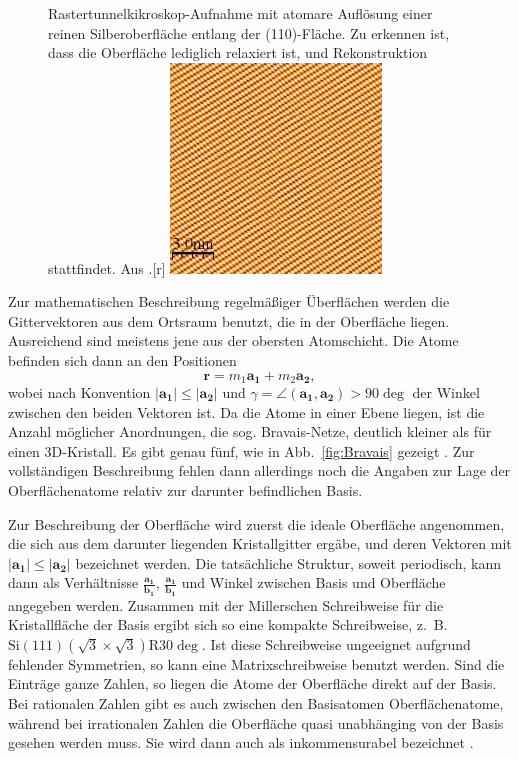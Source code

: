 \begin{figure}[!t]
  \begin{captionbeside}[]{Rastertunnelkikroskop-Aufnahme mit atomare Auflösung einer reinen 
Silberoberfläche entlang der (110)-Fläche. Zu erkennen ist, dass die Oberfläche 
lediglich relaxiert ist, und Rekonstruktion stattfindet. 
Aus \cite{kahn:stm_images}.}[r]
    \includegraphics[width=0.5\textwidth]{pics/Ag(110)_clean}
  \end{captionbeside}
  \label{fig:Ag(110)}
\end{figure}

Zur mathematischen Beschreibung regelmäßiger Überflächen werden die Gittervektoren 
aus dem Ortsraum benutzt, die in der Oberfläche liegen. Ausreichend sind meistens 
jene aus der obersten Atomschicht. Die Atome befinden sich dann an den Positionen 
\begin{equation}
    \mathbf{r} = m_1 \mathbf{a_1} + m_2 \mathbf{a_2},
\end{equation}
wobei nach Konvention $|\mathbf{a_1}| \le |\mathbf{a_2}|$ und 
$\gamma = \angle (\mathbf{a_1}, \mathbf{a_2}) > 90 \deg$ der Winkel zwischen den 
beiden Vektoren ist. Da die Atome in einer Ebene liegen, ist die Anzahl möglicher 
Anordnungen, die sog. Bravais-Netze, deutlich kleiner als für einen 3D-Kristall. 
Es gibt genau fünf, wie in Abb.~\ref{fig:Bravais} gezeigt 
\cite{henzler1991oberflachenphysik}.
Zur vollständigen Beschreibung fehlen dann allerdings noch die Angaben zur Lage 
der Oberflächenatome relativ zur darunter befindlichen Basis. 

Zur Beschreibung der Oberfläche wird zuerst die ideale Oberfläche angenommen, 
die sich aus dem darunter liegenden Kristallgitter ergäbe, und deren Vektoren mit
$|\mathbf{a_1}| \le |\mathbf{a_2}|$ bezeichnet werden. Die tatsächliche Struktur, 
soweit periodisch, kann dann als Verhältnisse $\frac{\mathbf{a_1}}{\mathbf{b_1}}$, 
$\frac{\mathbf{a_1}}{\mathbf{b_1}}$ und Winkel zwischen Basis und Oberfläche angegeben 
werden. Zusammen mit der Millerschen Schreibweise für die Kristallfläche der Basis 
ergibt sich so eine kompakte Schreibweise, z.~B. 
$\mathrm{Si}(111)(\sqrt{3} \times \sqrt{3}) \mathrm{R} 30 \deg$. 
Ist diese Schreibweise ungeeignet aufgrund fehlender Symmetrien, so kann eine 
Matrixschreibweise benutzt werden. Sind die Einträge ganze Zahlen, so liegen die 
Atome der Oberfläche direkt auf der Basis. Bei rationalen Zahlen gibt es auch 
zwischen den Basisatomen Oberflächenatome, während bei irrationalen Zahlen die 
Oberfläche quasi unabhänging von der Basis gesehen werden muss. Sie wird dann auch 
als inkommensurabel bezeichnet \cite{henzler1991oberflachenphysik}.

